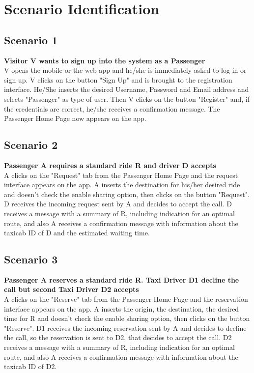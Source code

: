 \chapter{Scenario Identification} \label{chap4}

\section{Scenario 1}
\textbf {Visitor V wants to sign up into the system as a Passenger} \\
V opens the mobile or the web app and he/she is immediately asked to log in or sign up. V clicks on the button "Sign Up" and is brought to the registration interface. He/She inserts the desired Username, Password and Email address and selects "Passenger" as type of user. Then V clicks on the button "Register" and, if the credentials are correct, he/she receives a confirmation message. The Passenger Home Page now appears on the app.

\section{Scenario 2}
\textbf{Passenger A requires a standard ride R and driver D accepts} \\
A clicks on the "Request" tab from the Passenger Home Page and the request interface appears on the app. A inserts the destination for his/her desired ride and doesn't check the enable sharing option, then clicks on the button "Request". D receives the incoming request sent by A and decides to accept the call. D receives a message with a summary of R, including indication for an optimal route, and also A receives a confirmation message with information about the taxicab ID of D and the estimated waiting time. 

\section{Scenario 3}
\textbf{Passenger A reserves a standard ride R. Taxi Driver D1 decline the call but second Taxi Driver D2 accepts} \\
A clicks on the "Reserve" tab from the Passenger Home Page and the reservation interface appears on the app. A inserts the origin, the destination, the desired time for R and doesn't check the enable sharing option, then clicks on the button "Reserve". D1 receives the incoming reservation sent by A and decides to decline the call, so the reservation is sent to D2, that decides to accept the call. D2 receives a message with a summary of R, including indication for an optimal route, and also A receives a confirmation message with information about the taxicab ID of D2.

